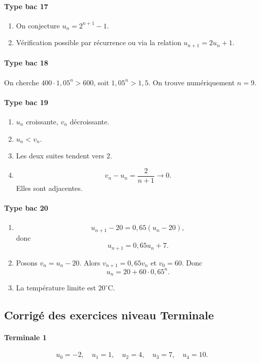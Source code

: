 \documentclass[11pt,a4paper]{article}
\theoremstyle{definition}
\begin{document}
\paragraph{Type bac 17}
\begin{enumerate}[label=\arabic*.]
    \item On conjecture $u_n=2^{n+1}-1$.
    \item Vérification possible par récurrence ou via la relation $u_{n+1}=2u_n+1$.
\end{enumerate}

\paragraph{Type bac 18}
On cherche $400\cdot1{,}05^n>600$, soit $1{,}05^n>1{,}5$. On trouve numériquement $n=9$.

\paragraph{Type bac 19}
\begin{enumerate}[label=\arabic*.]
    \item $u_n$ croissante, $v_n$ décroissante.
    \item $u_n<v_n$.
    \item Les deux suites tendent vers $2$.
    \item
    \[
    v_n-u_n=\frac{2}{n+1}\to0.
    \]
    Elles sont adjacentes.
\end{enumerate}

\paragraph{Type bac 20}
\begin{enumerate}[label=\arabic*.]
    \item
    \[
    u_{n+1}-20=0{,}65(u_n-20),
    \]
    donc
    \[
    u_{n+1}=0{,}65u_n+7.
    \]
    \item Posons $v_n=u_n-20$. Alors $v_{n+1}=0{,}65v_n$ et $v_0=60$.
    Donc
    \[
    u_n=20+60\cdot 0{,}65^n.
    \]
    \item La température limite est $20^\circ$C.
\end{enumerate}

\subsection{Corrigé des exercices niveau Terminale}

\paragraph{Terminale 1}
\[
u_0=-2,\quad u_1=1,\quad u_2=4,\quad u_3=7,\quad u_4=10.
\]
\end{document}
